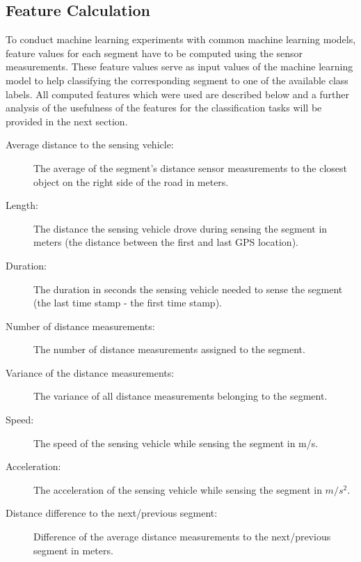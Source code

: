 \subsection{Feature Calculation}
\label{sec:feature_calculation}

To conduct machine learning experiments with common machine learning models, feature values for each segment have to be computed using the sensor measurements. These feature values serve as input values of the machine learning model to help classifying the corresponding segment to one of the available class labels. All computed features which were used are described below and a further analysis of the usefulness of the features for the classification tasks will be provided in the next section.

\begin{description}

\item[Average distance to the sensing vehicle:] The average of the segment's distance sensor measurements to the closest object on the right side of the road in meters.

\item[Length:] The distance the sensing vehicle drove during sensing the segment in meters (the distance between the first and last GPS location).

\item[Duration:] The duration in seconds the sensing vehicle needed to sense the segment (the last time stamp - the first time stamp).

\item[Number of distance measurements:] The number of distance measurements assigned to the segment.

\item[Variance of the distance measurements:] The variance of all distance measurements belonging to the segment.

\item[Speed:] The speed of the sensing vehicle while sensing the segment in m/s.

\item[Acceleration:] The acceleration of the sensing vehicle while sensing the segment in $m/s^2$.

\item[Distance difference to the next/previous segment:] Difference of the average distance measurements to the next/previous segment in meters.

\end{description}


